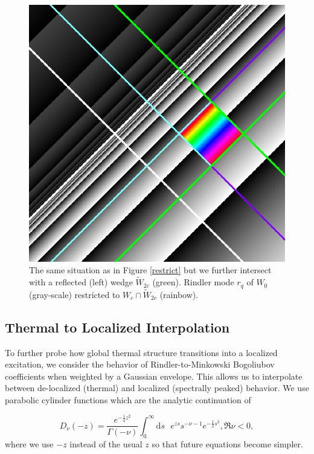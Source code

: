 \documentclass[12pt,a4paper]{article}
\newcommand{\dv}[1]{\mathrm{d} #1 \text{ }}
\begin{document}
\begin{figure}[h]
  \centering
\includegraphics[scale=0.4]{diamond_in_wedge.png}
\caption{The same situation as in Figure \ref{restrict} but we further intersect with a reflected (left) wedge $\widetilde{W}_{2c}$ (green). Rindler mode $r_q$ of $W_0$ (gray-scale) restricted to $W_c \cap \widetilde{W}_{2c}$ (rainbow).}
\label{diamond}
\end{figure}


\subsection{Thermal to Localized Interpolation}
To further probe how global thermal structure transitions into a localized excitation, we consider the behavior of Rindler-to-Minkowski Bogoliubov coefficients when weighted by a Gaussian envelope. This allows us to interpolate between de-localized (thermal) and localized (spectrally peaked) behavior. We use parabolic cylinder functions \cite{AbramowitzStegun1964,Olver1959UniformAE} which are the analytic continuation of 

\begin{equation}
D_\nu(-z) = \frac{e^{-\frac{1}{4}z^2}}{\Gamma\left(-\nu\right)} \int_0^\infty  \dv{s} e^{zs} s^{-\nu - 1} e^{-\frac{1}{2} s^2}, \mathfrak{R}\nu < 0,
\end{equation}
where we use $-z$ instead of the usual $z$ so that future equations become simpler.
\end{document}

